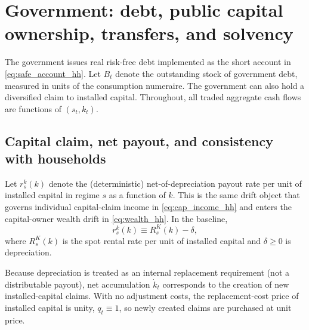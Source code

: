 \documentclass{article}
\begin{document}


\section{Government: debt, public capital ownership, transfers, and solvency}\label{sec:gov}

The government issues real risk-free debt implemented as the short account in \eqref{eq:safe_account_hh}.
Let $B_t$ denote the outstanding stock of government debt, measured in units of the consumption numeraire.
The government can also hold a diversified claim to installed capital. Throughout, all traded aggregate cash flows are functions of $(s_t,k_t)$.

\subsection{Capital claim, net payout, and consistency with households}

Let $r^k_s(k)$ denote the (deterministic) net-of-depreciation payout rate per unit of installed capital in regime $s$ as a function of $k$.
This is the same drift object that governs individual capital-claim income in \eqref{eq:cap_income_hh} and enters the capital-owner wealth drift in \eqref{eq:wealth_hh}.
In the baseline,
\begin{equation}\label{eq:rk_def_gov}
r^k_s(k)\equiv R^K_s(k)-\delta,
\end{equation}
where $R^K_s(k)$ is the spot rental rate per unit of installed capital and $\delta\ge 0$ is depreciation.

Because depreciation is treated as an internal replacement requirement (not a distributable payout), net accumulation $\dot k_t$ corresponds to the creation of new installed-capital claims.
With no adjustment costs, the replacement-cost price of installed capital is unity, $q_t\equiv 1$, so newly created claims are purchased at unit price.
\end{document}
